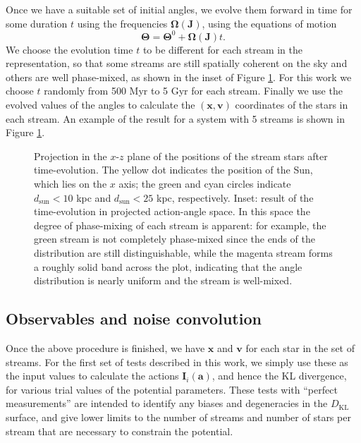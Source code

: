 \documentclass{emulateapj}
\newcommand{\sub}[2]{\ensuremath{#1_{\mathrm{#2}}}}
\begin{document}
Once we have a suitable set of initial angles, we evolve them forward in time for some duration $t$ using the frequencies $\mathbf{\Omega}(\mathbf{J})$, using the equations of motion
\begin{equation}
 \mathbf{\Theta} = \mathbf{\Theta}^{0} + \mathbf{\Omega}(\mathbf{J}) t.
\end{equation} 
We choose the evolution time $t$ to be different for each stream in the representation, so that some streams are still spatially coherent on the sky and others are well phase-mixed, as shown in the inset of Figure \ref{fig:streams}. For this work we choose $t$ randomly from 500 Myr to 5 Gyr for each stream. Finally we use the evolved values of the angles to calculate the $(\mathbf{x},\mathbf{v})$ coordinates of the stars in each stream. An example of the result for a system with 5 streams is shown in Figure \ref{fig:streams}.

\begin{figure}
\caption{Projection in the $x$-$z$ plane of the positions of the stream stars after time-evolution. The yellow dot indicates the position of the Sun, which lies on the $x$ axis; the green and cyan circles indicate $\sub{d}{sun} < 10$ kpc and $\sub{d}{sun}<25$ kpc, respectively. Inset: result of the time-evolution in projected action-angle space. In this space the degree of phase-mixing of each stream is apparent: for example, the green stream is not completely phase-mixed since the ends of the distribution are still distinguishable, while the magenta stream forms a roughly solid band across the plot, indicating that the angle distribution is nearly uniform and the stream is well-mixed.}
\label{fig:streams}
\end{figure}

\subsection{Observables and noise convolution}

Once the above procedure is finished, we have $\mathbf{x}$ and $\mathbf{v}$ for each star in the set of streams. For the first set of tests described in this work, we simply use these as the input values to calculate the actions $\mathbf{I}_i(\mathbf{a})$, and hence the KL divergence, for various trial values of the potential parameters. These tests with ``perfect measurements'' are intended to identify any biases and degeneracies in the $\sub{D}{KL}$ surface, and give lower limits to the number of streams and number of stars per stream that are necessary to constrain the potential.
\end{document}
